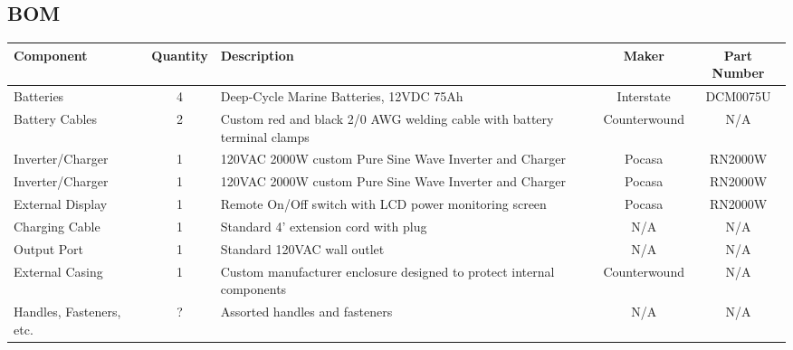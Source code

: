 \documentclass[../jb_user_manual.tex]{subfiles}
\begin{document}
\subsection{BOM}

\begin{center}
  \normalsize
  \begin{tabular}{ | l | c | p{5cm} | c | c | }
    \hline
        \textbf{Component} & \textbf{Quantity} & \textbf{Description} & \textbf{Maker} & \textbf{Part Number} \\ \hline
        Batteries & 4 & Deep-Cycle Marine Batteries, 12VDC 75Ah & Interstate & DCM0075U \\ \hline
        Battery Cables & 2 & Custom red and black 2/0 AWG welding cable with battery terminal clamps & Counterwound & N/A\\ \hline
        Inverter/Charger & 1 & 120VAC 2000W custom Pure Sine Wave Inverter and Charger & Pocasa & RN2000W \\ \hline
        Inverter/Charger & 1 & 120VAC 2000W custom Pure Sine Wave Inverter and Charger & Pocasa & RN2000W \\ \hline
        External Display & 1 & Remote On/Off switch with LCD power monitoring screen & Pocasa & RN2000W \\ \hline
        Charging Cable & 1 & Standard 4' extension cord with plug & N/A & N/A \\ \hline
        Output Port & 1 & Standard 120VAC wall outlet  & N/A & N/A \\ \hline
        External Casing & 1 & Custom manufacturer enclosure designed to protect internal components & Counterwound & N/A \\ \hline
        Handles, Fasteners, etc. & ? & Assorted handles and fasteners & N/A & N/A \\ \hline
    \end{tabular}
\end{center}
\end{document}
